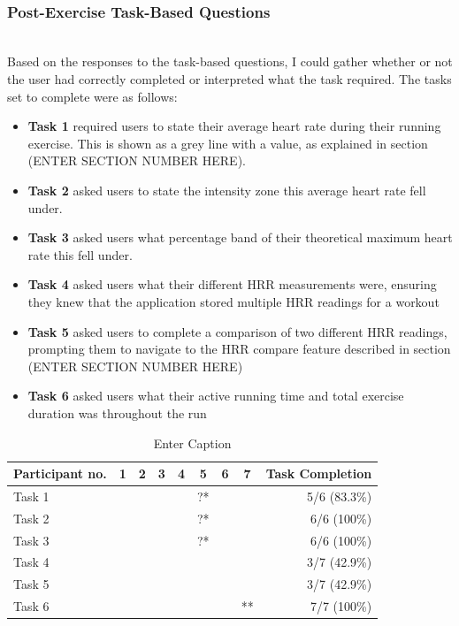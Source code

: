 \documentclass{l4proj}
\newcommand{\cmark}{\ding{51}}
\newcommand{\xmark}{\ding{55}}
\begin{document}
\noindent\mbox{}\\
\subsubsection{Post-Exercise Task-Based Questions}
\noindent\mbox{}\\

Based on the responses to the task-based questions, I could gather whether or not the user had correctly completed or interpreted what the task required. The tasks set to complete were as follows:

\begin{itemize}
    \item \textbf{Task 1} required users to state their average heart rate during their running exercise. This is shown as a grey line with a value, as explained in section (ENTER SECTION NUMBER HERE).
    \item \textbf{Task 2} asked users to state the intensity zone this average heart rate fell under.
    \item \textbf{Task 3} asked users what percentage band of their theoretical maximum heart rate this fell under.
    \item \textbf{Task 4} asked users what their different HRR measurements were, ensuring they knew that the application stored multiple HRR readings for a workout
    \item \textbf{Task 5} asked users to complete a comparison of two different HRR readings, prompting them to navigate to the HRR compare feature described in section (ENTER SECTION NUMBER HERE)
    \item \textbf{Task 6} asked users what their active running time and total exercise duration was throughout the run
\end{itemize}

\begin{table}[h!]
    \centering
    \caption{Enter Caption} %
    \label{fig:enter-label}
    \begin{tabular}{|l|ccccccc|r|}
        \hline  
        Participant no. & 1 & 2 & 3 & 4 & 5 & 6 & 7 & Task Completion \\
        \hline
        Task 1 & \cmark & \cmark & \cmark & \xmark & ?* & \cmark & \cmark & 5/6 (83.3\%)\\
        Task 2 & \cmark & \cmark & \cmark & \cmark & ?* & \cmark & \cmark & 6/6 (100\%)\\
        Task 3 & \cmark & \cmark & \cmark & \cmark & ?* & \cmark & \xmark & 6/6 (100\%)\\
        Task 4 & \xmark & \cmark & \xmark & \xmark & \cmark & \cmark & \xmark & 3/7 (42.9\%)\\
        Task 5 & \xmark & \cmark & \xmark & \xmark & \cmark & \cmark & \xmark & 3/7 (42.9\%)\\
        Task 6 & \cmark & \cmark & \cmark & \cmark & \cmark & \cmark & \cmark** & 7/7 (100\%)\\
        \hline
    \end{tabular}
\end{table}
\end{document}
